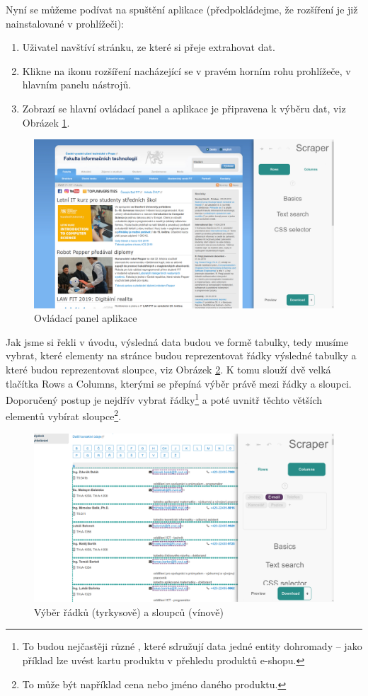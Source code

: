 \documentclass[thesis=B,czech]{FITthesis2}[2012/06/26]
\begin{document}
	Nyní se můžeme podívat na spuštění aplikace (předpokládejme, že rozšíření je již nainstalované v prohlížeči):
	\begin{enumerate}
		\item Uživatel navštíví stránku, ze které si přeje extrahovat dat.
		\item Klikne na ikonu rozšíření nacházející se v pravém horním rohu prohlížeče, v hlavním panelu nástrojů.
		\item Zobrazí se hlavní ovládací panel a aplikace je připravena k výběru dat, viz Obrázek \ref{fig:scraper_control_panel}.
	\end{enumerate}
	\begin{figure}[h]
		\includegraphics[width=\linewidth]{images/Scraper_control_panel.png}
		\caption{Ovládací panel aplikace}
		\label{fig:scraper_control_panel}
	\end{figure}

	Jak jsme si řekli v úvodu, výsledná data budou ve formě tabulky, tedy musíme vybrat, které elementy na stránce budou reprezentovat řádky výsledné tabulky a které budou reprezentovat sloupce, viz Obrázek \ref{fig:scraper_rows_cols}. K tomu slouží dvě velká tlačítka \textsf{Rows} a \textsf{Columns}, kterými se přepíná výběr právě mezi řádky a sloupci. Doporučený postup je nejdřív vybrat řádky\footnote{To budou nejčastěji různé , které sdružují data jedné entity dohromady -- jako příklad lze uvést kartu produktu v přehledu produktů e-shopu.} a poté uvnitř těchto větších elementů vybírat sloupce\footnote{To může být například cena nebo jméno daného produktu.}.
	\begin{figure}
		\includegraphics[width=\linewidth]{images/Scraper_rows_cols.png}
		\caption{Výběr řádků (tyrkysově) a sloupců (vínově)}
		\label{fig:scraper_rows_cols}
	\end{figure}
	
\end{document}
